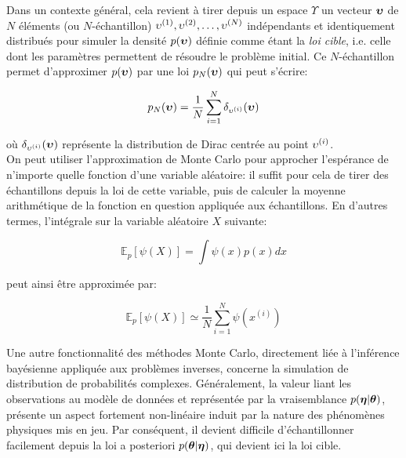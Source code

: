 Dans un contexte général, cela revient à tirer depuis un espace $\Upsilon$ un vecteur ${\bm{\upsilon}}$ de $N$ éléments (ou $N$-échantillon) ${\upsilon}^{(1)}, {\upsilon}^{(2)}, \dots, {\upsilon}^{(N)}$ indépendants et identiquement distribués pour simuler la densité $p({\bm{\upsilon}})$ définie comme étant la \textit{loi cible}, i.e. celle dont les paramètres permettent de résoudre le problème initial. Ce $N$-échantillon permet d'approximer $p({\bm{\upsilon}})$ par une loi $p_N({\bm{\upsilon}})$ qui peut s'écrire:

\begin{equation}
	p_N({\bm{\upsilon}}) = \dfrac{1}{N} \sum\limits_{i=1}^N\delta_{{\upsilon}^{(i)}}({\bm{\upsilon}})
	\label{eq_approximation_MC}
\end{equation}

où $\delta_{{\upsilon}^{(i)}}({\bm{\upsilon}})$ représente la distribution de Dirac centrée au point ${\upsilon}^{(i)}$. \\

On peut utiliser l'approximation de Monte Carlo pour approcher l'espérance de n'importe quelle fonction d'une variable aléatoire: il suffit pour cela de tirer des échantillons depuis la loi de cette variable, puis de calculer la moyenne arithmétique de la fonction en question appliquée aux échantillons. En d'autres termes, l'intégrale sur la variable aléatoire $X$ suivante:

\begin{equation}
	\mathbb{E}_p [\psi(X)] = \int \psi(x) p(x)dx
	\label{eq_integrale_MC_intractable}
\end{equation}

peut ainsi être approximée par:

\begin{equation}
	\mathbb{E}_p[\psi(X)] \simeq \dfrac{1}{N}\sum\limits_{i=1}^N \psi(x^{(i)})
	\label{eq_integrale_MC_approximation}
\end{equation}

Une autre fonctionnalité des méthodes Monte Carlo, directement liée à l'inférence bayésienne appliquée aux problèmes inverses, concerne la simulation de distribution de probabilités complexes. Généralement, la valeur liant les observations au modèle de données et représentée par la vraisemblance $p({\bm{\eta}} |{\bm{\theta}})$, présente un aspect fortement non-linéaire induit par la nature des phénomènes physiques mis en jeu. Par conséquent, il devient difficile d'échantillonner facilement depuis la loi a posteriori ${p({\bm{\theta}} | {\bm{\eta}})}$, qui devient ici la loi cible.\\

